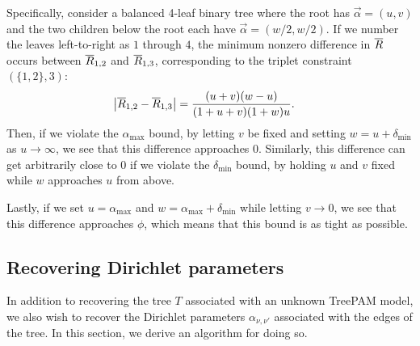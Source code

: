 \documentclass{article}
\theoremstyle{definition}
\newcommand{\deltaMin}{\delta_{\text{min}}}
\newcommand{\alphaMax}{\alpha_{\text{max}}}
\begin{document}
Specifically, consider a balanced 4-leaf binary tree where the root has $\vec\alpha = (u,v)$ and the two children below the root each have $\vec\alpha = (w/2,w/2)$.
If we number the leaves left-to-right as $1$ through $4$, the minimum nonzero difference in $\overline{R}$ occurs between $\overline{R}_{1,2}$ and $\overline{R}_{1,3}$, corresponding to the triplet constraint $(\{1,2\},3)$:
\begin{align*}
\left\lvert \overline{R}_{1,2} - \overline{R}_{1,3} \right\rvert
&=
\frac{ (u + v) (w-u) }{ (1 + u + v) (1 + w) u }.
\end{align*}
Then, if we violate the $\alphaMax$ bound, by letting $v$ be fixed and setting $w = u + \deltaMin$ as $u \to \infty$, we see that this difference approaches $0$.
Similarly, this difference can get arbitrarily close to $0$ if we violate the $\deltaMin$ bound, by holding $u$ and $v$ fixed while $w$ approaches $u$ from above.

Lastly, if we set $u = \alphaMax$ and $w = \alphaMax + \deltaMin$ while letting $v \to 0$, we see that this difference approaches $\phi$, which means that this bound is as tight as possible.


\subsection{Recovering Dirichlet parameters}
\label{sec:recover-dirichlet}
In addition to recovering the tree $T$ associated with an unknown TreePAM model, we also wish to recover the Dirichlet parameters $\alpha_{\nu,\nu'}$ associated with the edges of the tree.
In this section, we derive an algorithm for doing so.
\end{document}
